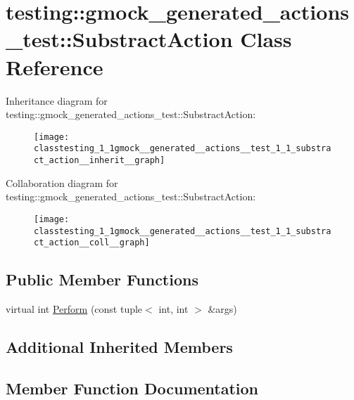 \hypertarget{classtesting_1_1gmock__generated__actions__test_1_1_substract_action}{}\section{testing\+:\+:gmock\+\_\+generated\+\_\+actions\+\_\+test\+:\+:Substract\+Action Class Reference}
\label{classtesting_1_1gmock__generated__actions__test_1_1_substract_action}


Inheritance diagram for testing\+:\+:gmock\+\_\+generated\+\_\+actions\+\_\+test\+:\+:Substract\+Action\+:
\nopagebreak
\begin{figure}[H]
\begin{center}
\leavevmode
\texttt{[image: classtesting\_1\_1gmock\_\_generated\_\_actions\_\_test\_1\_1\_substract\_action\_\_inherit\_\_graph]}
\end{center}
\end{figure}


Collaboration diagram for testing\+:\+:gmock\+\_\+generated\+\_\+actions\+\_\+test\+:\+:Substract\+Action\+:
\nopagebreak
\begin{figure}[H]
\begin{center}
\leavevmode
\texttt{[image: classtesting\_1\_1gmock\_\_generated\_\_actions\_\_test\_1\_1\_substract\_action\_\_coll\_\_graph]}
\end{center}
\end{figure}
\subsection*{Public Member Functions}
\begin{DoxyCompactItemize}
\item 
virtual int \hyperlink{classtesting_1_1gmock__generated__actions__test_1_1_substract_action_ac049ec6196668e17ef7384e08914f2c3}{Perform} (const tuple$<$ int, int $>$ \&args)
\end{DoxyCompactItemize}
\subsection*{Additional Inherited Members}


\subsection{Member Function Documentation}
